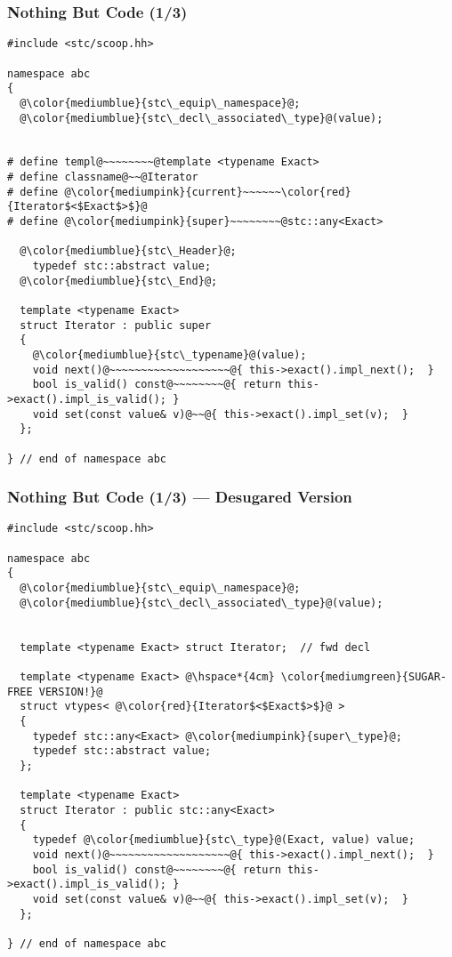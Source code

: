 \begin{frame}[fragile]
  \frametitle{Nothing But Code (1/3)}

%
\begin{lstlisting}[escapechar=@,basicstyle={\tiny\sffamily}]
#include <stc/scoop.hh>

namespace abc
{
  @\color{mediumblue}{stc\_equip\_namespace}@;
  @\color{mediumblue}{stc\_decl\_associated\_type}@(value);


# define templ@~~~~~~~~@template <typename Exact>
# define classname@~~@Iterator
# define @\color{mediumpink}{current}~~~~~~\color{red}{Iterator$<$Exact$>$}@
# define @\color{mediumpink}{super}~~~~~~~~@stc::any<Exact>

  @\color{mediumblue}{stc\_Header}@;
    typedef stc::abstract value;
  @\color{mediumblue}{stc\_End}@;

  template <typename Exact>
  struct Iterator : public super
  {
    @\color{mediumblue}{stc\_typename}@(value);
    void next()@~~~~~~~~~~~~~~~~~~~@{ this->exact().impl_next();  }
    bool is_valid() const@~~~~~~~~@{ return this->exact().impl_is_valid(); }
    void set(const value& v)@~~@{ this->exact().impl_set(v);  }
  };

} // end of namespace abc
\end{lstlisting}
%

\end{frame}




\begin{frame}[fragile]
  \frametitle{Nothing But Code (1/3) --- Desugared Version}

%
\begin{lstlisting}[escapechar=@,basicstyle={\tiny\sffamily}]
#include <stc/scoop.hh>

namespace abc
{
  @\color{mediumblue}{stc\_equip\_namespace}@;
  @\color{mediumblue}{stc\_decl\_associated\_type}@(value);


  template <typename Exact> struct Iterator;  // fwd decl

  template <typename Exact> @\hspace*{4cm} \color{mediumgreen}{SUGAR-FREE VERSION!}@
  struct vtypes< @\color{red}{Iterator$<$Exact$>$}@ >
  {
    typedef stc::any<Exact> @\color{mediumpink}{super\_type}@;
    typedef stc::abstract value;
  };
  
  template <typename Exact>
  struct Iterator : public stc::any<Exact>
  {
    typedef @\color{mediumblue}{stc\_type}@(Exact, value) value;
    void next()@~~~~~~~~~~~~~~~~~~~@{ this->exact().impl_next();  }
    bool is_valid() const@~~~~~~~~@{ return this->exact().impl_is_valid(); }
    void set(const value& v)@~~@{ this->exact().impl_set(v);  }
  };

} // end of namespace abc
\end{lstlisting}
%

\end{frame}





